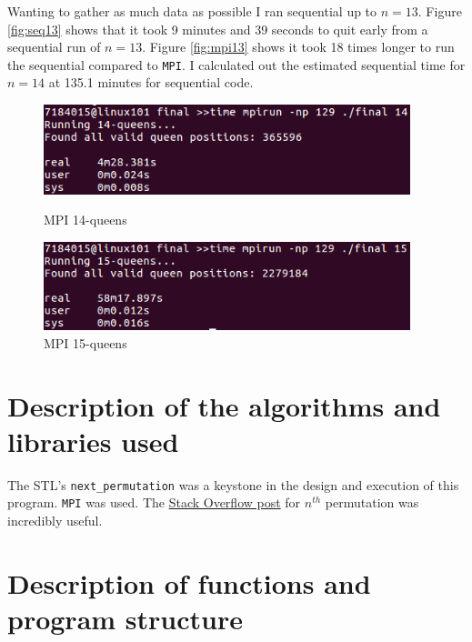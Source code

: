 \documentclass{article}
\begin{document}
Wanting to gather as much data as possible I ran sequential up to $n=13$. Figure 
\ref{fig:seq13} shows that it took 9 minutes and 39 seconds to quit early from a 
sequential run of $n=13$. Figure \ref{fig:mpi13} shows it took 18 times longer 
to run the sequential compared to \verb|MPI|. I calculated out the estimated 
sequential time for $n=14$ at 135.1 minutes for sequential code.

\begin{figure}[h]
    \centering
    \begin{minipage}{0.49\textwidth}
        \centering
        \includegraphics[width=0.95\textwidth]{MPI_14}
        \caption{MPI 14-queens}
        \label{fig:mpi14}
    \end{minipage}\hfill
    \begin{minipage}{0.49\textwidth}
        \centering
        \includegraphics[width=0.95\textwidth]{MPI_15}
        \caption{MPI 15-queens}
        \label{fig:mpi15}
    \end{minipage}
\end{figure}

\section{Description of the algorithms and libraries used}
The STL's \verb|next_permutation| was a keystone in the design and execution of 
this program. \verb|MPI| was used. The 
\href{https://stackoverflow.com/a/7919887}{Stack Overflow post} for $n^{th}$ 
permutation was incredibly useful.

\section{Description of functions and program structure}
\end{document}
